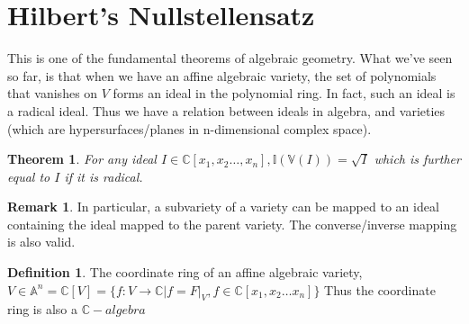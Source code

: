 \documentclass[12pt]{book}
\newtheorem{theorem}{Theorem}[chapter]
\theoremstyle{definition}
\newtheorem*{definition}{Definition}
\newtheorem*{remark}{Remark}
\begin{document}
\section{Hilbert's Nullstellensatz}
This is one of the fundamental theorems of algebraic geometry. What we've seen so far, is that when we have an affine algebraic variety, the set of polynomials that vanishes on $V$ forms an ideal in the polynomial ring. In fact, such an ideal is a radical ideal. Thus we have a relation between ideals in algebra, and varieties (which are hypersurfaces/planes in n-dimensional complex space).
\begin{theorem}
    For any ideal $I \in \mathbb{C}[x_1, x_2 \ldots, x_n], \mathbb{I}(\mathbb{V}(I)) = \sqrt{I}$ which is further equal to $I$ if it is radical.
\end{theorem}
\begin{remark}
    In particular, a subvariety of a variety can be mapped to an ideal containing the ideal mapped to the parent variety. The converse/inverse mapping is also valid.
\end{remark}
\begin{definition}
    The coordinate ring of an affine algebraic variety, $V \in \mathbb{A}^n = \mathbb{C}[V] = \{f: V \to \mathbb{C} | f = F|_V, f \in \mathbb{C}[x_1, x_2 \ldots x_n]\}$
    Thus the coordinate ring is also a $\mathbb{C}-algebra$
\end{definition}
\end{document}
